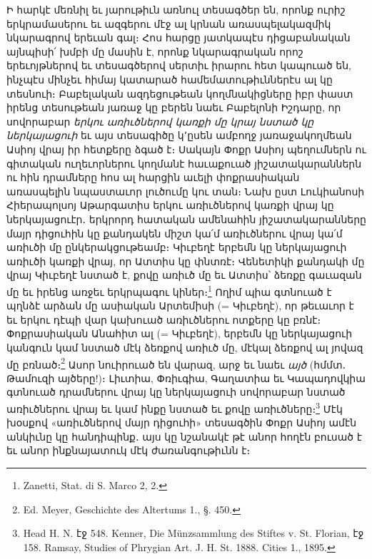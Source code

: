 \documentclass{article}
\begin{document}
{Ի հարկէ մեռնիլ եւ յարութիւն առնուլ տեսագծեր են, որոնք ուրիշ երկրամասերու եւ ազգերու մէջ ալ կրնան առասպելակազմիկ նկարագրով երեւան գալ։ Հոս հարցը յատկապէս դիցաբանական այնպիսի՛ խմբի մը մասին է, որոնք նկարագրական որոշ երեւոյթներով եւ տեսագծերով սերտիւ իրարու հետ կապուած են, ինչպէս մինչեւ հիմայ կատարած համեմատութիւններէս ալ կը տեսնուի։ Բաբելական ազդեցութեան կողմնակիցները իբր փաստ իրենց տեսութեան յառաջ կը բերեն նաեւ Բաբելոնի Իշդարը, որ սովորաբար \emph{երկու առիւծներով կառքի մը կրայ նստած կը ներկայացուի} եւ այս տեսագիծը կ՚ըսեն ամբողջ յառաջակողմեան Ասիոյ վրայ իր հետքերը ձգած է։ Սակայն Փոքր Ասիոյ պեղումներն ու գիտական ուղեւորներու կողմանէ հաւաքուած յիշատակարաններն ու հին դրամները հոս ալ հարցին աւելի փոքրասիական առասպելին նպաստաւոր լուծումը կու տան։ Նախ ըստ Լուկիանոսի Հիերապոլսոյ Աթարգատիս երկու առիւծներով կառքի վրայ կը ներկայացուէր․ երկրորդ հատական ամենահին յիշատակարանները մայր դիցուհին կը քանդակեն միշտ կա՛մ առիւծներու վրայ կա՛մ առիւծի մը ընկերակցութեամբ։ Կիւբեղէ երբեմն կը ներկայացուի առիւծի կառքի վրայ, որ Ատտիս կը փնտռէ։ Վենետիկի քանդակի մը վրայ Կիւբեղէ նստած է, քովը առիւծ մը եւ Ատտիս՝ ձեռքը գաւազան մը եւ իրենց առջեւ երկրպագու կիներ։\footnote{Zanetti, Stat. di S. Marco 2, 2.} Ողիմ պիա գտնուած է պղնձէ արձան մը ասիական Արտեմիսի (= Կիւբեղէ), որ թեւաւոր է եւ երկու դէպի վար կախուած առիւծներու ոտքերը կը բռնէ։ Փոքրասիական Անահիտ ալ (= Կիւբեղէ), երբեմն կը ներկայացուի կանգուն կամ նստած մէկ ձեռքով առիւծ մը, մէկալ ձեռքով ալ յովազ մը բռնած։\footnote{Ed. Meyer, Geschichte des Altertums 1., §. 450.} Ասոր նուիրուած են վարազ, արջ եւ նաեւ \emph{այծ} (հմմտ․ Թամուզի այծերը!)։ Լիւտիա, Փռիւգիա, Գաղատիա եւ Կապադովկիա գտնուած դրամներու վրայ կը ներկայացուի սովորաբար նստած առիւծներու վրայ եւ կամ ինքը նստած եւ քովը առիւծները։\footnote{Head H. N. էջ 548. Kenner, Die Münzsammlung des Stiftes v. St. Florian, էջ 158. Ramsay, Studies of Phrygian Art. J. H. St. 1888. Cities 1., 1895.} Մէկ խօսքով «առիւծներով մայր դիցուհի» տեսագծին Փոքր Ասիոյ ամէն անկիւնը կը հանդիպինք․ այս կը նշանակէ թէ անոր հողէն բուսած է եւ անոր ինքնայատուկ մէկ ժառանգութիւնն է։

}
\end{document}
